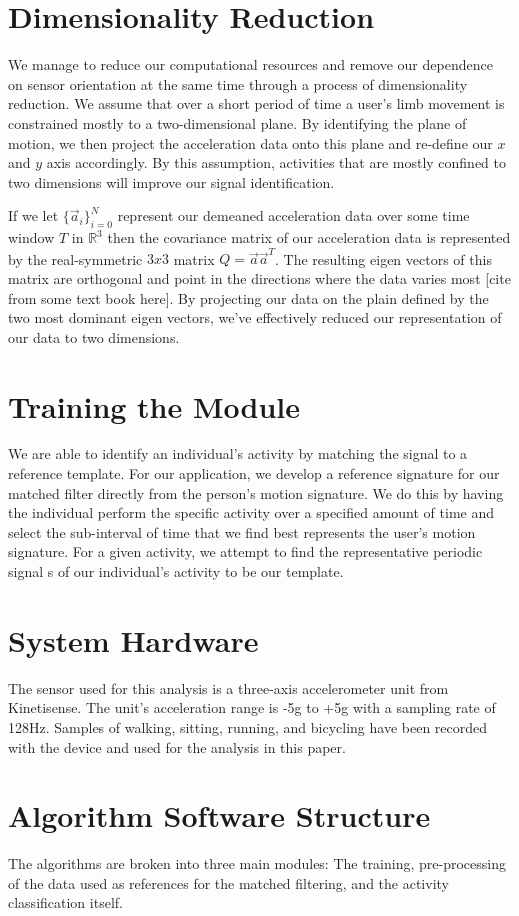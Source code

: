 \documentclass[journal]{IEEEtran}
\begin{document}
\section{Dimensionality Reduction}
We manage to reduce our computational resources and remove our dependence on sensor orientation at the same time through a process of dimensionality reduction.
We assume that over a short period of time a user’s limb movement is constrained mostly to a two-dimensional plane.
By identifying the plane of motion, we then project the acceleration data onto this plane and re-define our $x$ and $y$ axis accordingly.
By this assumption, activities that are mostly confined to two dimensions will improve our signal identification.

If we let $\{\vec{a}_i\}_{i=0}^{N}$ represent our demeaned acceleration data over some time window $T$ in $\mathbb{R}^3$ then the covariance matrix of our acceleration data is represented by the real-symmetric $3x3$ matrix $Q = \vec{a} \vec{a}^T$.
The resulting eigen vectors of this matrix are orthogonal and point in the directions where the data varies most [cite from some text book here].
By projecting our data on the plain defined by the two most dominant eigen vectors, we've effectively reduced our representation of our data to two dimensions.
%
\section{Training the Module}
We are able to identify an individual\textquotesingle's activity by matching the signal to a reference template.
For our application, we develop a reference signature for our matched filter directly from the person\textquotesingle’s motion signature.
We do this by having the individual perform the specific activity over a specified amount of time and select the sub-interval of time that we find best represents the user's motion signature.
For a given activity, we attempt to find the representative periodic signal s of our individual’s activity to be our template.
%
\section{System Hardware}
The sensor used for this analysis is a three-axis accelerometer unit from Kinetisense.
The unit’s acceleration range is -5g to +5g with a sampling rate of 128Hz.
Samples of walking, sitting, running, and bicycling have been recorded with the device and used for the analysis in this paper.
%
\section{Algorithm Software Structure}
%
The algorithms are broken into three main modules: The training, pre-processing of the data used as references for the matched filtering, and the activity classification itself.
\end{document}

